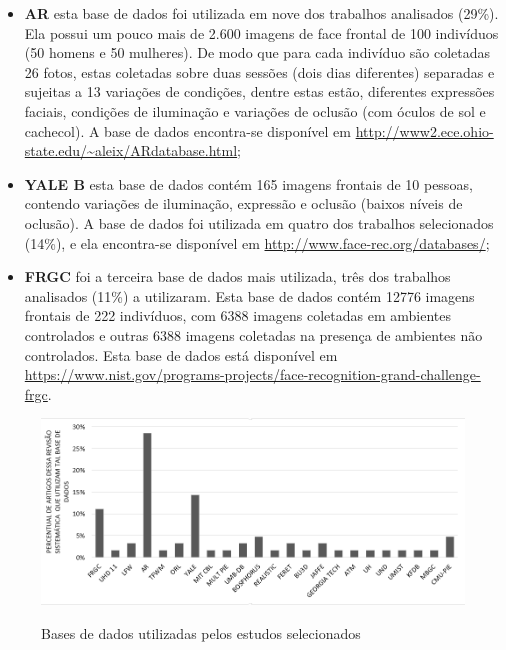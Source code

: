 \begin{itemize}
\item \textbf{AR} esta base de dados foi utilizada em nove dos trabalhos analisados (29\%). Ela possui um pouco mais de 2.600 imagens de face frontal de 100 indivíduos (50 homens e 50 mulheres). De modo que para cada indivíduo são coletadas 26 fotos, estas coletadas sobre duas sessões (dois dias diferentes) separadas e sujeitas a 13 variações de condições, dentre estas estão, diferentes expressões faciais, condições de iluminação e variações de oclusão (com óculos de sol e cachecol). A base de dados encontra-se disponível em \url{http://www2.ece.ohio-state.edu/~aleix/ARdatabase.html};

\item \textbf{YALE B} esta base de dados contém 165 imagens frontais de 10 pessoas, contendo variações de iluminação, expressão e oclusão (baixos níveis de oclusão). A base de dados foi utilizada em quatro dos trabalhos selecionados (14\%), e ela encontra-se disponível em \url{http://www.face-rec.org/databases/};

\item \textbf{FRGC} foi a terceira base de dados mais utilizada, três dos trabalhos analisados (11\%) a utilizaram. Esta base de dados contém 12776 imagens frontais de 222 indivíduos, com 6388 imagens coletadas em ambientes controlados e outras 6388 imagens coletadas na presença de ambientes não controlados. Esta base de dados está disponível em \url{https://www.nist.gov/programs-projects/face-recognition-grand-challenge-frgc}.

\end{itemize}

\begin{figure}[H]
\centering
\caption{Bases de dados utilizadas pelos estudos selecionados}
\includegraphics[scale = 0.62]{imgs/bases.png}
\label{fig:basesDeDados}
\end{figure}


